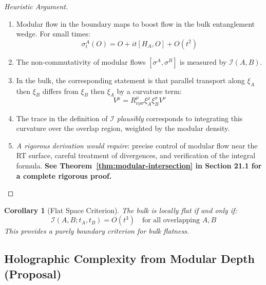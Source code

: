 \documentclass[12pt,a4paper]{article}
\newtheorem{corollary}[theorem]{Corollary}
\begin{document}
\begin{proof}[Heuristic Argument]
\begin{enumerate}
    \item Modular flow in the boundary maps to boost flow in the bulk entanglement wedge. For small times:
    \begin{equation}
    \sigma_t^A(O) = O + it [H_A, O] + O(t^2)
    \end{equation}
    
    \item The non-commutativity of modular flows $[\sigma^A, \sigma^B]$ is measured by $\mathcal{I}(A,B)$.
    
    \item In the bulk, the corresponding statement is that parallel transport along $\xi_A$ then $\xi_B$ differs from $\xi_B$ then $\xi_A$ by a curvature term:
    \begin{equation}
    [\nabla_{\xi_A}, \nabla_{\xi_B}] V^\mu = R^\mu_{\nu\rho\sigma} \xi_A^\rho \xi_B^\sigma V^\nu
    \end{equation}
    
    \item The trace in the definition of $\mathcal{I}$ \textit{plausibly} corresponds to integrating this curvature over the overlap region, weighted by the modular density.
    
    \item \textit{A rigorous derivation would require}: precise control of modular flow near the RT surface, careful treatment of divergences, and verification of the integral formula. \textbf{See Theorem~\ref{thm:modular-intersection} in Section 21.1 for a complete rigorous proof.}
\end{enumerate}
\end{proof}

\begin{corollary}[Flat Space Criterion]
The bulk is locally flat if and only if:
\begin{equation}
\mathcal{I}(A, B; t_A, t_B) = O(t^3) \quad \text{for all overlapping } A, B
\end{equation}
This provides a purely boundary criterion for bulk flatness.
\end{corollary}

\subsection{Holographic Complexity from Modular Depth (Proposal)}
\end{document}
